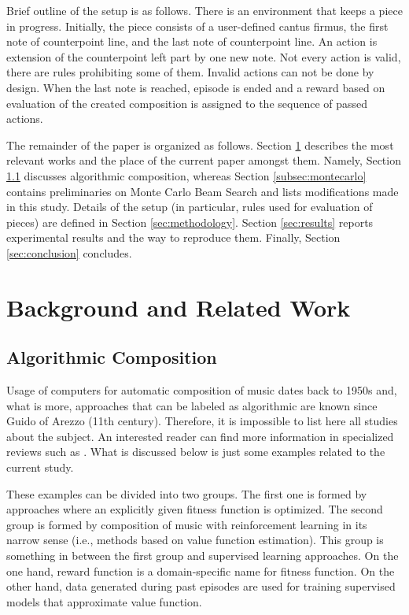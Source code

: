 \documentclass{article}
\begin{document}
Brief outline of the setup is as follows. There is an environment that keeps a piece in progress. Initially, the piece consists of a user-defined cantus firmus, the first note of counterpoint line, and the last note of counterpoint line. An action is extension of the counterpoint left part by one new note. Not every action is valid, there are rules prohibiting some of them. Invalid actions can not be done by design. When the last note is reached, episode is ended and a reward based on evaluation of the created composition is assigned to the sequence of passed actions.

The remainder of the paper is organized as follows. Section \ref{sec:literature} describes the most relevant works and the place of the current paper amongst them. Namely, Section \ref{subsec:composition} discusses algorithmic composition, whereas Section \ref{subsec:montecarlo} contains preliminaries on Monte Carlo Beam Search and lists modifications made in this study. Details of the setup (in particular, rules used for evaluation of pieces) are defined in Section \ref{sec:methodology}. Section \ref{sec:results} reports experimental results and the way to reproduce them. Finally, Section \ref{sec:conclusion} concludes.


\section{Background and Related Work}
\label{sec:literature}

\subsection{Algorithmic Composition}
\label{subsec:composition}

Usage of computers for automatic composition of music dates back to 1950s and, what is more, approaches that can be labeled as algorithmic are known since Guido of Arezzo (11th century). Therefore, it is impossible to list here all studies about the subject. An interested reader can find more information in specialized reviews such as \cite{fernandez2013ai}. What is discussed below is just some examples related to the current study.

These examples can be divided into two groups. The first one is formed by approaches where an explicitly given fitness function is optimized. The second group is formed by composition of music with reinforcement learning in its narrow sense (i.e., methods based on value function estimation). This group is something in between the first group and supervised learning approaches. On the one hand, reward function is a domain-specific name for fitness function. On the other hand, data generated during past episodes are used for training supervised models that approximate value function.
\end{document}
